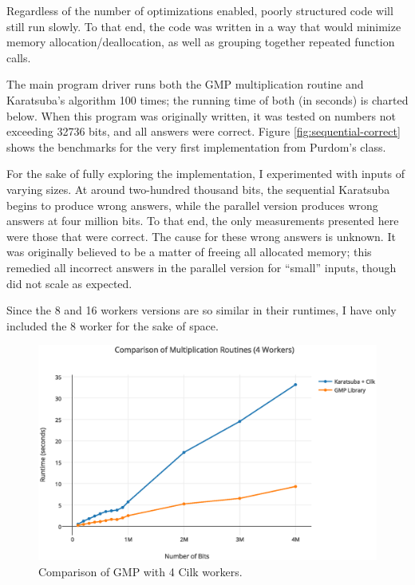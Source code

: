 \documentclass[8pt, twocolumn]{article}
\begin{document}
Regardless of the number of optimizations enabled, poorly structured code will
still run slowly.  To that end, the code was written in a way that would
minimize memory allocation/deallocation, as well as grouping together repeated
function calls.

The main program driver runs both the GMP multiplication routine and Karatsuba's
algorithm 100 times; the running time of both (in seconds) is charted below.
When this program was originally written, it was tested on numbers not exceeding
32736 bits, and all answers were correct.  Figure \ref{fig:sequential-correct} shows the
benchmarks for the very first implementation from Purdom's class.

For the sake of fully exploring the implementation, I experimented with inputs
of varying sizes.  At around two-hundred thousand bits, the sequential Karatsuba
begins to produce wrong answers, while the parallel version produces wrong
answers at four million bits.  To that end, the only measurements presented here
were those that were correct.  The cause for these wrong answers is unknown.  It
was originally believed to be a matter of freeing all allocated memory; this
remedied all incorrect answers in the parallel version for ``small'' inputs,
though did not scale as expected.

Since the 8 and 16 workers versions are so similar in their runtimes, I have
only included the 8 worker for the sake of space.

\begin{figure}[t]
    \includegraphics[scale=0.4]{4-workers}
    \caption{Comparison of GMP with 4 Cilk workers.}
    \label{fig:4-workers}
\end{figure}
\end{document}

